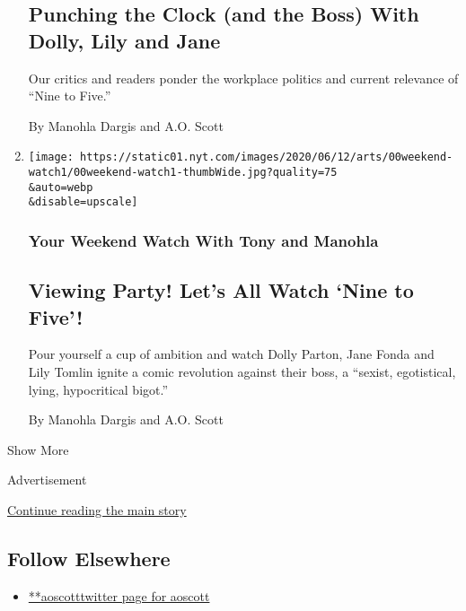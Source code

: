 \begin{enumerate}
  \hypertarget{punching-the-clock-and-the-boss-with-dolly-lily-and-jane}{%
  \subsection{Punching the Clock (and the Boss) With Dolly, Lily and
  Jane}\label{punching-the-clock-and-the-boss-with-dolly-lily-and-jane}}

  Our critics and readers ponder the workplace politics and current
  relevance of ``Nine to Five.''

  By Manohla Dargis and A.O. Scott
\item
  \href{/2020/06/11/movies/nine-to-five-dolly-parton.html}{}

  \texttt{[image: https://static01.nyt.com/images/2020/06/12/arts/00weekend-watch1/00weekend-watch1-thumbWide.jpg?quality=75\\\&auto=webp\\\&disable=upscale]}

  \hypertarget{your-weekend-watch-with-tony-and-manohla-2}{%
  \subsubsection{Your Weekend Watch With Tony and
  Manohla}\label{your-weekend-watch-with-tony-and-manohla-2}}

  \hypertarget{viewing-party-lets-all-watch-nine-to-five}{%
  \subsection{Viewing Party! Let's All Watch `Nine to
  Five'!}\label{viewing-party-lets-all-watch-nine-to-five}}

  Pour yourself a cup of ambition and watch Dolly Parton, Jane Fonda and
  Lily Tomlin ignite a comic revolution against their boss, a ``sexist,
  egotistical, lying, hypocritical bigot.''

  By Manohla Dargis and A.O. Scott
\end{enumerate}

Show More

Advertisement

\protect\hyperlink{after-mid2}{Continue reading the main story}

\hypertarget{follow-elsewhere}{%
\subsection{Follow Elsewhere}\label{follow-elsewhere}}

\begin{itemize}
\tightlist
\item
  \href{https://twitter.com/aoscott}{**aoscotttwitter page for aoscott}
\end{itemize}

